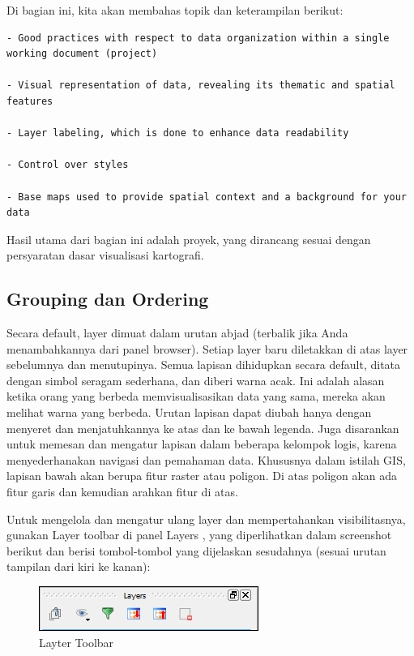 \documentclass[]{book}
\begin{document}
Di bagian ini, kita akan membahas topik dan keterampilan berikut:

\begin{verbatim}
- Good practices with respect to data organization within a single working document (project)

- Visual representation of data, revealing its thematic and spatial features

- Layer labeling, which is done to enhance data readability

- Control over styles

- Base maps used to provide spatial context and a background for your data
\end{verbatim}

Hasil utama dari bagian ini adalah proyek, yang dirancang sesuai dengan persyaratan dasar visualisasi kartografi.

\hypertarget{grouping-dan-ordering}{%
\subsection{Grouping dan Ordering}\label{grouping-dan-ordering}}

Secara default, layer dimuat dalam urutan abjad (terbalik jika Anda menambahkannya dari panel browser). Setiap layer baru diletakkan di atas layer sebelumnya dan menutupinya. Semua lapisan dihidupkan secara default, ditata dengan simbol seragam sederhana, dan diberi warna acak. Ini adalah alasan ketika orang yang berbeda memvisualisasikan data yang sama, mereka akan melihat warna yang berbeda. Urutan lapisan dapat diubah hanya dengan menyeret dan menjatuhkannya ke atas dan ke bawah legenda. Juga disarankan untuk memesan dan mengatur lapisan dalam beberapa kelompok logis, karena menyederhanakan navigasi dan pemahaman data. Khususnya dalam istilah GIS, lapisan bawah akan berupa fitur raster atau poligon. Di atas poligon akan ada fitur garis dan kemudian arahkan fitur di atas.

Untuk mengelola dan mengatur ulang layer dan mempertahankan visibilitasnya, gunakan Layer toolbar di panel Layers , yang diperlihatkan dalam screenshot berikut dan berisi tombol-tombol yang dijelaskan sesudahnya (sesuai urutan tampilan dari kiri ke kanan):

\begin{figure}

{\centering \includegraphics[width=0.3\linewidth]{images/09/fig91} 

}

\caption{Layter Toolbar}\label{fig:fig91}
\end{figure}
\end{document}
